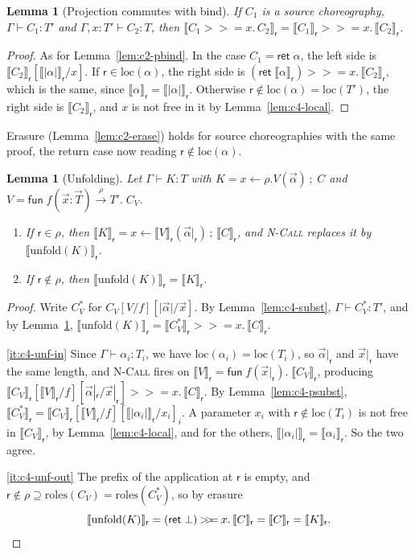 \documentclass[11pt]{report}
\theoremstyle{plain}
\newtheorem{lemma}[theorem]{Lemma}
\theoremstyle{definition}
\theoremstyle{remark}
\newcommand{\kw}[1]{\mathsf{#1}}
\newcommand{\rr}{\mathsf{r}}
\newcommand{\bind}[3]{#1 \leftarrow #2\,;\;#3}
\newcommand{\cret}[1]{\kw{ret}\;#1}
\newcommand{\mbind}[3]{#1 \mathbin{>\!\!>\!\!=} #2.\,#3}
\newcommand{\unfold}[1]{\mathrm{unfold}(#1)}
\newcommand{\roles}[1]{\mathrm{roles}(#1)}
\newcommand{\loc}[1]{\mathrm{loc}(#1)}
\newcommand{\pay}[1]{\lvert #1\rvert}
\newcommand{\nfun}[3]{\kw{fun}\;#1(#2).\;#3}
\newcommand{\proj}[2]{\llbracket #1 \rrbracket_{#2}}
\newcommand{\cfun}[5]{\kw{fun}\;#1(#2) \xrightarrow{#3} #4.\;#5}
\newcommand{\rn}[1]{{\normalfont\scshape #1}}
\begin{document}
\begin{lemma}[Projection commutes with bind]\label{lem:c4-pbind}
  If $C_1$ is a source choreography, $\Gamma\vdash C_1:T'$ and
  $\Gamma,x{:}T'\vdash C_2:T$, then
  $\proj{\mbind{C_1}{x}{C_2}}{\rr}=\mbind{\proj{C_1}{\rr}}{x}{\proj{C_2}{\rr}}$.
\end{lemma}
\begin{proof}
  As for Lemma~\ref{lem:c2-pbind}.  In the case $C_1=\cret{\alpha}$, the left
  side is $\proj{C_2}{\rr}[\proj{\pay{\alpha}}{\rr}/x]$.  If
  $\rr\in\loc{\alpha}$, the right side is
  $\mbind{(\kw{ret}\;\proj{\alpha}{\rr})}{x}{\proj{C_2}{\rr}}$, which is the
  same, since $\proj{\alpha}{\rr}=\proj{\pay{\alpha}}{\rr}$.  Otherwise
  $\rr\notin\loc{\alpha}=\loc{T'}$, the right side is $\proj{C_2}{\rr}$, and
  $x$ is not free in it by Lemma~\ref{lem:c4-local}.
\end{proof}

Erasure (Lemma~\ref{lem:c2-erase}) holds for source choreographies with the
same proof, the return case now reading $\rr\notin\loc{\alpha}$.

\begin{lemma}[Unfolding]\label{lem:c4-unfold}
  Let $\Gamma\vdash K:T$ with $K=\bind{x}{\rho.V(\vec\alpha)}{C}$ and
  $V=\cfun{f}{\vec x{:}\vec T}{\rho}{T'}{C_V}$.
  \begin{enumerate}[label=(\roman*),nosep]
  \item\label{it:c4-unf-in} If $\rr\in\rho$, then
    $\proj{K}{\rr}=x\leftarrow\proj{V}{\rr}(\vec\alpha|_\rr)\,;\,\proj{C}{\rr}$,
    and \rn{N-Call} replaces it by $\proj{\unfold{K}}{\rr}$.
  \item\label{it:c4-unf-out} If $\rr\notin\rho$, then $\proj{\unfold{K}}{\rr}=\proj{K}{\rr}$.
  \end{enumerate}
\end{lemma}
\begin{proof}
  Write $C_V^\ast$ for $C_V[V/f][\pay{\vec\alpha}/\vec x]$.  By
  Lemma~\ref{lem:c4-subst}, $\Gamma\vdash C_V^\ast:T'$, and by
  Lemma~\ref{lem:c4-pbind},
  $\proj{\unfold{K}}{\rr}=\mbind{\proj{C_V^\ast}{\rr}}{x}{\proj{C}{\rr}}$.

  \ref{it:c4-unf-in} Since $\Gamma\vdash\alpha_i:T_i$, we have
  $\loc{\alpha_i}=\loc{T_i}$, so $\vec\alpha|_\rr$ and $\vec x|_\rr$ have the
  same length, and \rn{N-Call} fires on
  $\proj{V}{\rr}=\nfun{f}{\vec x|_\rr}{\proj{C_V}{\rr}}$, producing
  $\mbind{\proj{C_V}{\rr}[\proj{V}{\rr}/f][\vec\alpha|_\rr/\vec x|_\rr]}{x}{\proj{C}{\rr}}$.
  By Lemma~\ref{lem:c4-psubst},
  $\proj{C_V^\ast}{\rr}=\proj{C_V}{\rr}[\proj{V}{\rr}/f][\proj{\pay{\alpha_i}}{\rr}/x_i]_i$.
  A parameter $x_i$ with $\rr\notin\loc{T_i}$ is not free in
  $\proj{C_V}{\rr}$, by Lemma~\ref{lem:c4-local}, and for the others,
  $\proj{\pay{\alpha_i}}{\rr}=\proj{\alpha_i}{\rr}$.  So the two agree.

  \ref{it:c4-unf-out} The prefix of the application at $\rr$ is empty, and
  $\rr\notin\rho\supseteq\roles{C_V}=\roles{C_V^\ast}$, so by erasure
  \[
    \proj{\unfold{K}}{\rr}=\mbind{(\kw{ret}\;\bot)}{x}{\proj{C}{\rr}}=\proj{C}{\rr}=\proj{K}{\rr}.\qedhere
  \]
\end{proof}
\end{document}
